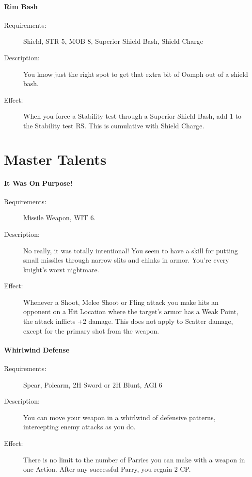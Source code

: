 \documentclass[oneside,11pt,english]{book}
\begin{document}
\paragraph{\label{talent:Rim Bash}Rim Bash}
	\begin{description}
		\item [Requirements:] Shield, STR 5, MOB 8, Superior Shield Bash, Shield Charge 
		\item [Description:] You know just the right spot to get that extra bit of Oomph out of a shield bash. 
		\item [Effect:] When you force a Stability test through a Superior Shield Bash, add 1 to the Stability test RS. 
This is cumulative with Shield Charge. 
	\end{description}
\section{Master Talents}\label{sec:Master Talents}
\paragraph{\label{talent:It Was On Purpose!}It Was On Purpose!}
	\begin{description}
		\item [Requirements:] Missile Weapon, WIT 6.
		\item [Description:] No really, it was totally intentional! You seem to have a skill for putting small missiles 
through narrow slits and chinks in armor. You’re every knight’s worst nightmare. 
		\item [Effect:] Whenever a Shoot, Melee Shoot or Fling attack you make hits an opponent on a Hit Location 
where the target’s armor has a Weak Point, the attack inflicts +2 damage. This does not apply to Scatter 
damage, except for the primary shot from the weapon. 

	\end{description}
\paragraph{\label{talent:Whirlwind Defense}Whirlwind Defense}
	\begin{description}
		\item [Requirements:] Spear, Polearm, 2H Sword or 2H Blunt, AGI 6 
		\item [Description:] You can move your weapon in a whirlwind of defensive patterns, intercepting enemy attacks as you do. 
		\item [Effect:] There is no limit to the number of Parries you can make with a weapon in one Action. After any successful Parry, you regain 2 CP. 

	\end{description}
\end{document}
